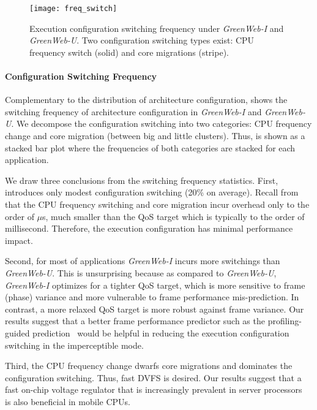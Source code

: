\begin{figure}[t]
  \centering
  \texttt{[image: freq\_switch]}
  \caption{Execution configuration switching frequency under \textit{GreenWeb-I} and \textit{GreenWeb-U}. Two configuration switching types exist: CPU frequency switch (solid) and core migrations (stripe).}
  \label{fig:freq_switch}
\end{figure}

\paragraph{Configuration Switching Frequency} Complementary to the distribution of architecture configuration,  shows the switching frequency of architecture configuration in \textit{GreenWeb-I} and \textit{GreenWeb-U}. We decompose the configuration switching into two categories: CPU frequency change and core migration (between big and little clusters). Thus,  is shown as a stacked bar plot where the frequencies of both categories are stacked for each application.

We draw three conclusions from the switching frequency statistics. First, \greenweb introduces only modest configuration switching (20\% on average). Recall from  that the CPU frequency switching and core migration incur overhead only to the order of $\mu$s, much smaller than the QoS target which is typically to the order of millisecond. Therefore, the execution configuration has minimal performance impact.

Second, for most of applications \textit{GreenWeb-I} incurs more switchings than \textit{GreenWeb-U}. This is unsurprising because as compared to \textit{GreenWeb-U}, \textit{GreenWeb-I} optimizes for a tighter QoS target, which is more sensitive to frame (phase) variance and more vulnerable to frame performance mis-prediction. In contrast, a more relaxed QoS target is more robust against frame variance. Our results suggest that a better frame performance predictor such as the profiling-guided prediction~\cite{pgdvfs} would be helpful in reducing the execution configuration switching in the imperceptible mode.

Third, the CPU frequency change dwarfs core migrations and dominates the configuration switching. Thus, fast DVFS is desired. Our results suggest that a fast on-chip voltage regulator that is increasingly prevalent in server processors~\cite{fivr,ivr} is also beneficial in mobile CPUs.

